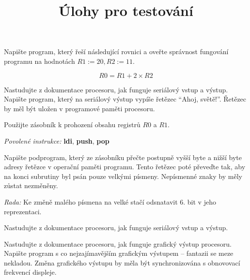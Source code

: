 \documentclass[a4,12pt]{exam}
\title{Úlohy pro testování}
\author{}
\date{}
\begin{document}
\maketitle

\begin{questions}
	
	
	Napište program, který řeší následující rovnici a oveřte správnost fungování programu na hodnotách \( R1 := 20, R2 := 11 \).
	
	\[ R0 = R1 + 2 \times R2 \]
	
	
	Nastudujte z dokumentace procesoru, jak funguje seriálový vstup a výstup. Napište program, který na seriálový výstup vypíše řetězec ``Ahoj, světě!''. Řetězec by měl být uložen v programové paměti procesoru.
	
	
	Použijte zásobník k prohození obsahu registrů \(R0\) a \(R1\).
	
	\textit{Povolené instrukce:} \textbf{ldi}, \textbf{push}, \textbf{pop}
	
	
	Napište podprogram, který ze zásobníku přečte postupně vyšší byte a nižší byte adresy řetězce v operační paměti programu. Tento řetězec poté převeďte tak, aby na konci subrutiny byl psán pouze velkými písmeny. Nepísmenné znaky by měly zůstat nezměněny.
	
	\textit{Rada:} Ke změně malého písmena na velké stačí odsnatavit 6. bit v jeho reprezentaci.
	
	
	Nastudujte z dokumentace procesoru, jak funguje seriálový vstup a výstup.
	

	
	Nastudujte z dokumentace procesoru, jak funguje grafický výstup procesoru. Napište program s co nejzajímavějším grafickým výstupem -- fantazii se meze nekladou. Změna grafického výstupu by měla být synchronizována s obnovovací frekvencí displeje.
	
\end{questions}
\end{document}
